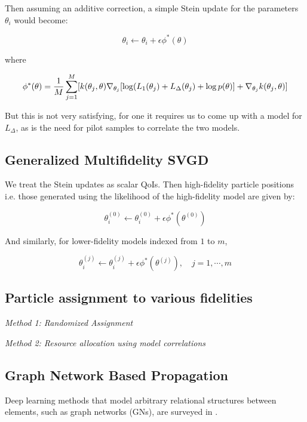\documentclass[12pt]{article}
\renewcommand{\[}{\left[}
\renewcommand{\]}{\right]}
\renewcommand{\(}{\left(}
\renewcommand{\)}{\right)}
\newcommand{\grad}[1]{\nabla #1}
\begin{document}
Then assuming an additive correction, a simple Stein update for the parameters $\theta_i$ would become:

\begin{equation}
    \theta_i \leftarrow \theta_i + \epsilon \phi^{\ast}(\theta)
\end{equation}

where 

\begin{equation}
    \phi^{\ast}(\theta) = \frac{1}{M}\sum_{j=1}^{M}[k(\theta_j, \theta) \grad_{\theta_j}[\log (L_{1}(\theta_j) + L_{\Delta}(\theta_j) + \log p(\theta)] + \grad_{\theta_j} k(\theta_j, \theta)]
\end{equation}

But this is not very satisfying, for one it requires us to come up with a model for $L_{\Delta}$, as is the need for pilot samples to correlate the two models.

\subsection{Generalized Multifidelity SVGD}

We treat the Stein updates as scalar QoIs. Then high-fidelity particle positions i.e. those generated using the likelihood of the high-fidelity model are given by:

\begin{equation*}
    \theta^{(0)}_i \leftarrow \theta^{(0)}_i + \epsilon \phi^{\ast}(\theta^{(0)})
\end{equation*}

And similarly, for lower-fidelity models indexed from $1$ to $m$,

\begin{equation*}
    \theta^{(j)}_i \leftarrow \theta^{(j)}_i + \epsilon \phi^{\ast}(\theta^{(j)}), \quad j=1, \cdots, m
\end{equation*}

\subsection{Particle assignment to various fidelities}

\emph{Method 1: Randomized Assignment}


\noindent \emph{Method 2: Resource allocation using model correlations}

\subsection{Graph Network Based Propagation}
Deep learning methods that model arbitrary relational structures between elements, such as graph networks (GNs), are surveyed in \cite{battaglia_relational_2018}. 
\end{document}
